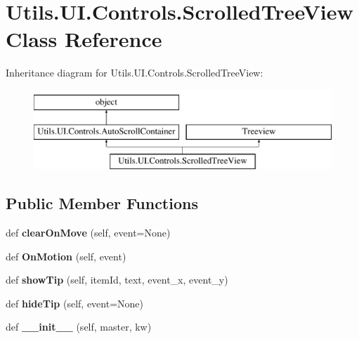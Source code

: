 \hypertarget{class_c_utils_1_1_utils_1_1_u_i_1_1_controls_1_1_scrolled_tree_view}{}\section{Utils.\+U\+I.\+Controls.\+Scrolled\+Tree\+View Class Reference}
\label{class_c_utils_1_1_utils_1_1_u_i_1_1_controls_1_1_scrolled_tree_view}
Inheritance diagram for Utils.\+U\+I.\+Controls.\+Scrolled\+Tree\+View\+:\begin{figure}[H]
\begin{center}
\leavevmode
\includegraphics[height=3.000000cm]{class_c_utils_1_1_utils_1_1_u_i_1_1_controls_1_1_scrolled_tree_view}
\end{center}
\end{figure}
\subsection*{Public Member Functions}
\begin{DoxyCompactItemize}
\item 
\mbox{\label{class_c_utils_1_1_utils_1_1_u_i_1_1_controls_1_1_scrolled_tree_view_ae6645e6d34396c7c51b80d9b8f7d4ed1}} 
def {\bfseries clear\+On\+Move} (self, event=None)
\item 
\mbox{\label{class_c_utils_1_1_utils_1_1_u_i_1_1_controls_1_1_scrolled_tree_view_a508f7bacf9ccbf6610b5c16218ec1085}} 
def {\bfseries On\+Motion} (self, event)
\item 
\mbox{\label{class_c_utils_1_1_utils_1_1_u_i_1_1_controls_1_1_scrolled_tree_view_aaf53b59f766d5d03501a9df01b054d75}} 
def {\bfseries show\+Tip} (self, item\+Id, text, event\+\_\+x, event\+\_\+y)
\item 
\mbox{\label{class_c_utils_1_1_utils_1_1_u_i_1_1_controls_1_1_scrolled_tree_view_a42d1da3c0fa907a93351f3f6e3e7c864}} 
def {\bfseries hide\+Tip} (self, event=None)
\item 
\mbox{\label{class_c_utils_1_1_utils_1_1_u_i_1_1_controls_1_1_scrolled_tree_view_aa3be958b4753452478bab15ebbdc356b}} 
def {\bfseries \+\_\+\+\_\+init\+\_\+\+\_\+} (self, master, kw)
\end{DoxyCompactItemize}

